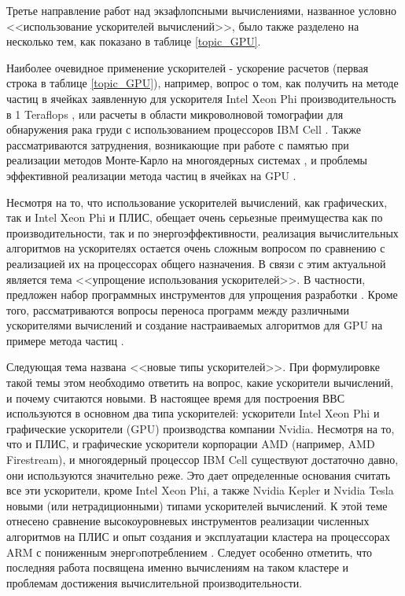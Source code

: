 Третье направление работ над экзафлопсными вычислениями, названное условно <<использование ускорителей вычислений>>, было также разделено на несколько тем, как показано в таблице \ref{topic_GPU}.

Наиболее очевидное применение ускорителей - ускорение расчетов (первая строка в таблице \ref{topic_GPU}), например, вопрос о том, как получить на методе частиц в ячейках заявленную для ускорителя Intel Xeon Phi производительность в 1 Teraflops \cite{Nakashima2015}, или расчеты в области микроволновой томографии для обнаружения рака груди с использованием процессоров IBM Cell \cite{Xu20121106}. Также рассматриваются затруднения, возникающие при работе с памятью при реализации методов Монте-Карло на многоядерных системах \cite{Tramm2015195}, и проблемы эффективной реализации метода частиц в ячейках на GPU \cite{Gong2012588,Kong2011,Safi20151290}.

Несмотря на то, что использование ускорителей вычислений, как графических, так и Intel Xeon Phi и ПЛИС, обещает
очень серьезные преимущества как по производительности, так и по энергоэффективности, реализация вычислительных алгоритмов на  ускорителях остается очень сложным вопросом по сравнению с реализацией их на процессорах общего назначения. В связи с этим актуальной является тема <<упрощение использования ускорителей>>.
В частности, предложен набор программных инструментов для упрощения разработки \cite{Dongarra2015}.
Кроме того, рассматриваются вопросы переноса программ между различными ускорителями вычислений \cite{Subotic2013450} и 
создание настраиваемых алгоритмов для GPU на примере метода частиц \cite{Decyk2011}. 	 

Следующая тема названа <<новые типы ускорителей>>. При формулировке такой темы этом необходимо ответить на вопрос, какие ускорители вычислений, и почему считаются новыми. В настоящее время для построения ВВС используются в основном два типа ускорителей: ускорители Intel Xeon Phi и графические ускорители (GPU) производства компании Nvidia. Несмотря на то, что и ПЛИС, и графические ускорители корпорации AMD (например, AMD Firestream), и многоядерный процессор IBM Cell существуют достаточно давно, они используются значительно реже. Это дает определенные основания считать все эти ускорители, кроме 
Intel Xeon Phi, а также Nvidia Kepler и Nvidia Tesla новыми (или нетрадиционными) типами ускорителей вычислений. К этой теме отнесено сравнение высокоуровневых инструментов реализации численных алгоритмов на ПЛИС \cite{Warne201495} и опыт создания и эксплуатации кластера на процессорах ARM с пониженным энергoпотреблением \cite{Rajovic2014}. Следует особенно отметить, что последняя работа посвящена именно вычислениям на таком кластере и проблемам достижения вычислительной производительности.


